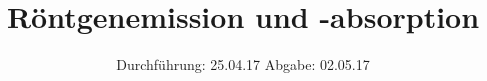 

\subject{V603}
\title{Röntgenemission und -absorption}
\date{
  Durchführung: 25.04.17
  \hspace{3em}
  Abgabe: 02.05.17
}



\maketitle
\thispagestyle{empty}
\tableofcontents
\newpage






\printbibliography


